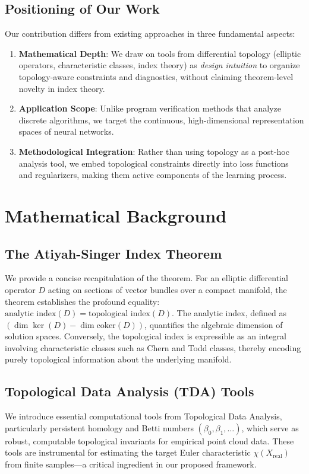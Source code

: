\documentclass[10pt,leqno]{amsart}
\begin{document}
\subsection{Positioning of Our Work}
Our contribution differs from existing approaches in three fundamental aspects:
\begin{enumerate}
    \item \textbf{Mathematical Depth}: We draw on tools from differential topology (elliptic operators, characteristic classes, index theory) as \emph{design intuition} to organize topology-aware constraints and diagnostics, without claiming theorem-level novelty in index theory.
    \item \textbf{Application Scope}: Unlike program verification methods that analyze discrete algorithms, we target the continuous, high-dimensional representation spaces of neural networks.
    \item \textbf{Methodological Integration}: Rather than using topology as a post-hoc analysis tool, we embed topological constraints directly into loss functions and regularizers, making them active components of the learning process.
\end{enumerate}

\section{Mathematical Background}
\subsection{The Atiyah-Singer Index Theorem}
We provide a concise recapitulation of the theorem. For an elliptic differential operator $D$ acting on sections of vector bundles over a compact manifold, the theorem establishes the profound equality: $\text{analytic index}(D) = \text{topological index}(D)$. The analytic index, defined as $(\dim \ker(D) - \dim \text{coker}(D))$, quantifies the algebraic dimension of solution spaces. Conversely, the topological index is expressible as an integral involving characteristic classes such as Chern and Todd classes, thereby encoding purely topological information about the underlying manifold.

\subsection{Topological Data Analysis (TDA) Tools}
We introduce essential computational tools from Topological Data Analysis, particularly persistent homology and Betti numbers $(\beta_0, \beta_1, \ldots)$, which serve as robust, computable topological invariants for empirical point cloud data. These tools are instrumental for estimating the target Euler characteristic $\chi(X_{\text{real}})$ from finite samples---a critical ingredient in our proposed framework.
\end{document}
